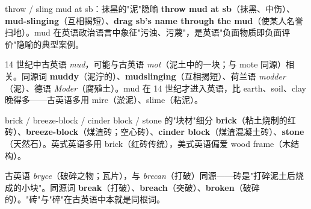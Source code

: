 \documentclass[../main.tex]{subfiles}
\begin{document}


\begin{gram}{throw / sling mud at sb：抹黑的"泥"隐喻}
\textbf{throw mud at sb}（抹黑、中伤）、\textbf{mud-slinging}（互相揭短）、\textbf{drag sb's name through the mud}（使某人名誉扫地）。mud 在英语政治语言中象征"污浊、污蔑"，是英语"负面物质即负面评价"隐喻的典型案例。
\end{gram}

\begin{origin}
14 世纪中古英语 \textit{mud}，可能与古英语 \textit{mot}（泥土中的一块；与 mote 同源）相关。同源词 \textbf{muddy}（泥泞的）、\textbf{mudslinging}（互相揭短）、荷兰语 \textit{modder}（泥）、德语 \textit{Moder}（腐殖土）。mud 在 14 世纪才进入英语，比 earth、soil、clay 晚得多——古英语多用 mire（淤泥）、slime（粘泥）。
\end{origin}




\begin{gram}{brick / breeze-block / cinder block / stone 的"块材"细分}
\textbf{brick}（粘土烧制的红砖）、\textbf{breeze-block}（煤渣砖；空心砖）、\textbf{cinder block}（煤渣混凝土砖）、\textbf{stone}（天然石）。英式英语多用 brick（红砖传统），美式英语偏爱 wood frame（木结构）。
\end{gram}

\begin{origin}
古英语 \textit{bryce}（破碎之物；瓦片），与 \textit{brecan}（打破）同源——砖是"打碎泥土后烧成的小块"。同源词 \textbf{break}（打破）、\textbf{breach}（突破）、\textbf{broken}（破碎的）。"砖"与"碎"在古英语中本就是同根词。
\end{origin}

\end{document}
